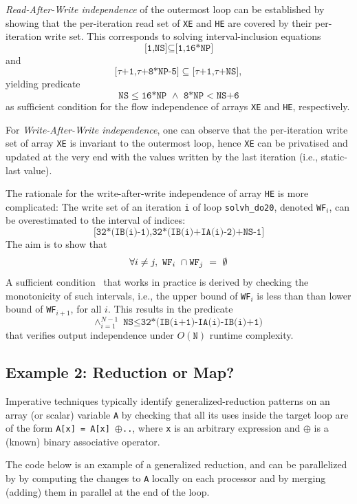 \textit{Read-After-Write independence} of the outermost loop can be
established by showing that the per-iteration read set of \texttt{XE}
and \texttt{HE} are covered by their per-iteration write set. This
corresponds to solving interval-inclusion equations
\[
  \texttt{[1,NS]$\subseteq$[1,16*NP]}
\]
and
\[
  \texttt{[$\tau$+1,$\tau$+8*NP-5]$\subseteq$[$\tau$+1,$\tau$+NS]},
\]
yielding predicate
\[
  \texttt{NS$\leq$16*NP $\wedge$ 8*NP$<$NS+6}
\]
as sufficient condition for the flow independence of arrays
\texttt{XE} and \texttt{HE}, respectively.

For \textit{Write-After-Write independence}, one can observe that the
per-iteration write set of array \texttt{XE} is invariant to the
outermost loop, hence \texttt{XE} can be privatised and updated at the
very end with the values written by the last iteration (i.e.,
static-last value).

The rationale for the write-after-write independence of array
\texttt{HE} is more complicated: The write set of an iteration
\texttt{i} of loop \texttt{solvh\_do20},
denoted \texttt{WF$_i$}, can be overestimated to the interval of indices:
\[
  \texttt{[32*(IB(i)-1),32*(IB(i)+IA(i)-2)+NS-1]}
  \]
  The aim is to show that
  \[
    \forall i \neq j, \ \mbox{\texttt{WF}}_i \ \cap
    \mbox{\texttt{WF}}_j \ = \ \emptyset
\]
A sufficient condition~\cite{OanceaMon} that works in practice is
derived by checking the monotonicity of such intervals, i.e., the
upper bound of \texttt{WF$_i$} is less than than lower bound of
\texttt{WF$_{i+1}$}, for all $i$.
This results in the predicate
\[
  \wedge_{i=1}^{N-1}\texttt{NS$\leq$32*(IB(i+1)-IA(i)-IB(i)+1)}
\]
that verifies output independence under $O(\texttt{N})$ runtime
complexity.

\subsection{Example 2: Reduction or Map?}
\label{subsec:eg2}

Imperative techniques typically identify generalized-reduction
patterns on an array (or scalar) variable \texttt{A} by checking that
all its uses inside the target loop are of the form \texttt{A[x] =
  A[x] $\oplus$..}, where \texttt{x} is an arbitrary expression and
$\oplus$ is a (known) binary associative operator.

The code below is an example of a generalized reduction, and can be
parallelized by by computing the changes to \texttt{A} locally on each
processor and by merging (adding) them in parallel at the end of the
loop.


